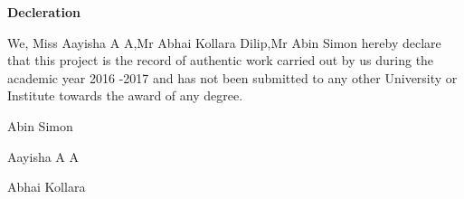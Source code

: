 \vspace{2in}

\LARGE{\bfseries{Decleration}}

\hspace{1in}

\normalsize
We, Miss Aayisha A A,Mr Abhai Kollara Dilip,Mr Abin Simon hereby declare that this project is the record of authentic work carried out by us during the academic year 2016 -2017 and has not been submitted to any other University or Institute towards the award of any degree.

\vspace{5em}

\begin{minipage}[b]{0.33333\textwidth}
\raggedright
Abin Simon
\end{minipage}%
\begin{minipage}[b]{0.33333\textwidth}
\centering
Aayisha A A
\end{minipage}%
\begin{minipage}[b]{0.33333\textwidth}
\raggedleft
Abhai Kollara
\end{minipage}
